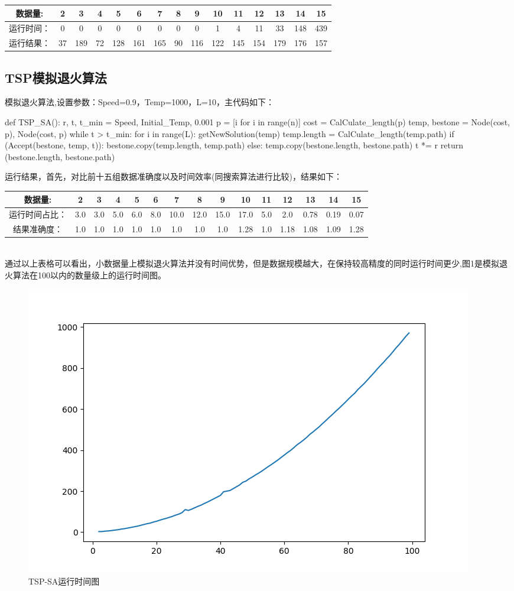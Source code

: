 \documentclass[paper=a4,margin=0.5cm]{scrartcl} %
\begin{document}
\begin{tabular}{ccccccccccccccc}
	\hline 
	数据量: & 2 & 3 & 4 & 5 & 6 & 7 & 8 & 9 & 10 & 11 & 12 & 13 & 14 & 15\\ 
	\hline 
	运行时间：& 0 & 0 & 0 & 0 & 0 & 0 & 0 & 0 & 1 & 4 & 11 & 33 & 148 & 439 \\ 
	\hline 
	运行结果：& 37 & 189 & 72 & 128 & 161 & 165 & 90 & 116 & 122 & 145 & 154 & 179 & 176 & 157\\ 
	\hline 
\end{tabular}



\subsection{TSP模拟退火算法}
\indent 模拟退火算法,设置参数：Speed=0.9，Temp=1000，L=10，主代码如下：\\
\begin{python}
def TSP_SA():
	r, t, t_min = Speed, Initial_Temp, 0.001
	p = [i for i in range(n)]
	cost = CalCulate_length(p)
	temp, bestone = Node(cost, p), Node(cost, p)
	while t > t_min:
		for i in range(L):
			getNewSolution(temp)
			temp.length = CalCulate_length(temp.path)
			if (Accept(bestone, temp, t)):
				bestone.copy(temp.length, temp.path)
			else:
				temp.copy(bestone.length, bestone.path)
		t *= r
	return (bestone.length, bestone.path)
\end{python}

\indent 运行结果，首先，对比前十五组数据准确度以及时间效率(同搜索算法进行比较)，结果如下：\\
\begin{tabular}{ccccccccccccccc}
	\hline 
	数据量: & 2 & 3 & 4 & 5 & 6 & 7 & 8 & 9 & 10 & 11 & 12 & 13 & 14 & 15\\ 
	\hline 
	运行时间占比：& 3.0 & 3.0 & 5.0 & 6.0 & 8.0 & 10.0 & 12.0 & 15.0 & 17.0 & 5.0 & 2.0 & 0.78 & 0.19 & 0.07 \\ 
	\hline 
	结果准确度：& 1.0 & 1.0 & 1.0 & 1.0 & 1.0 & 1.0 & 1.0 & 1.0 & 1.28 & 1.0 & 1.18 & 1.08 & 1.09 & 1.28\\ 
	\hline 
\end{tabular}
\\
\indent 通过以上表格可以看出，小数据量上模拟退火算法并没有时间优势，但是数据规模越大，在保持较高精度的同时运行时间更少,图1是模拟退火算法在100以内的数量级上的运行时间图。\\
\begin{figure}
	\centering
	\includegraphics[width=0.7\linewidth]{TSPSA}
	\caption{TSP-SA运行时间图}
	\label{fig:tspsa}
\end{figure}
\end{document}
